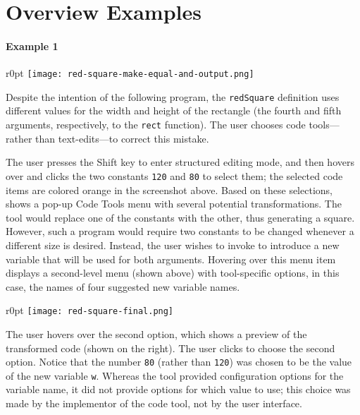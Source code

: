 \section{Overview Examples}
\label{sec:overview}


\setlength{\intextsep}{6pt}%
\setlength{\columnsep}{10pt}%

\newcommand{\overviewExample}[2]{\paragraph{Example {#1}}}


\overviewExample{1}{Red Square}


\begin{wrapfigure}{r}{0pt}
\texttt{[image: red-square-make-equal-and-output.png]}
\end{wrapfigure}
Despite the intention of the following program,
the \verb+redSquare+ definition uses different values
for the width and height of the rectangle
(the fourth and fifth arguments, respectively, to the
\verb+rect+ function).
The user chooses \deuce{} code tools---rather than
text-edits---to correct this mistake.

The user presses the Shift key to enter structured editing mode, and then hovers
over and clicks the two constants \verb+120+ and \verb+80+ to select them; the
selected code items are colored orange in the screenshot above.
Based on these selections, \deuce{} shows a pop-up Code Tools menu with several
potential transformations.
The  tool would replace one of the constants with the
other, thus generating a square. However, such a program would require two
constants to be changed whenever a different size is desired.
Instead, the user wishes to invoke  to introduce a
new variable that will be used for both arguments. Hovering over this menu item
displays a second-level menu (shown above) with tool-specific options, in this
case, the names of four suggested new variable names.

\begin{wrapfigure}{r}{0pt}
\texttt{[image: red-square-final.png]}
\end{wrapfigure}
The user hovers over the second option, which shows a preview of
the transformed code (shown on the right).
The user clicks to choose the second option.
Notice that the number \verb+80+ (rather than \verb+120+) was
chosen to be the value of the new variable \verb+w+.
Whereas the tool provided configuration options for the
variable name, it did not provide options for which value to use;
this choice was made by the implementor of the  code tool,
not by the \deuce{} user interface.


